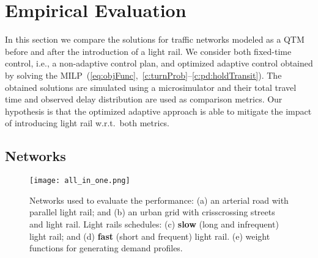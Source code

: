 \section{Empirical Evaluation}
  
In this section we compare the solutions for traffic networks modeled as a QTM
before and after the introduction of a light rail.
%
We consider both fixed-time control, i.e., a non-adaptive control plan, and
optimized adaptive control obtained by solving the
MILP~(\ref{eq:objFunc},~\ref{c:turnProb}--\ref{c:pd:holdTransit}).
%
The obtained solutions are simulated using a microsimulator and their total
travel time and observed delay distribution are used as comparison metrics.
%
Our hypothesis is that the optimized adaptive approach is able to mitigate the
impact of introducing light rail w.r.t.\ both metrics.
%






\subsection{Networks}


\begin{figure*}
\centering
\texttt{[image: all\_in\_one.png]}%
%
%
\begin{subfigure}{1em}{\label{fig:net:arterial}}\end{subfigure}%
\begin{subfigure}{1em}{\label{fig:net:grid}}\end{subfigure}%
\begin{subfigure}{1em}{\label{fig:transit1}}\end{subfigure}%
\begin{subfigure}{1em}{\label{fig:transit2}}\end{subfigure}%
\begin{subfigure}{1em}{\label{fig:demand_profiles}}\end{subfigure}%
%
\vspace{-3mm}
%
\caption{Networks used to evaluate the performance: (a) an arterial road with
parallel light rail; and (b) an urban grid with crisscrossing streets and light
rail.
%
Light rails schedules: (c) \textbf{slow} (long and infrequent) light rail; 
and (d) \textbf{fast} (short and frequent) light rail.
%
(e) weight functions for generating demand profiles.}
%
\vspace{-3mm}
\end{figure*}

